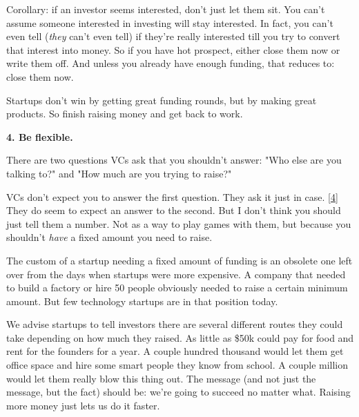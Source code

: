 Corollary:
                    if an investor seems interested, don't just let them sit.
                    You can't assume someone interested in investing will stay
                    interested. In fact, you can't even tell (\emph{they} can't
                    even tell) if they're really interested till you try to
                    convert that interest into money. So if you have hot
                    prospect, either close them now or write them off. And
                    unless you already have enough funding, that reduces to:
                    close them now.

Startups don't win by getting
                    great funding rounds, but by making great products. So
                    finish raising money and get back to work.


                    \textbf{4. Be flexible.}

There are two questions
                    VCs ask that you shouldn't answer: "Who else are you talking
                    to?" and "How much are you trying to raise?"

VCs
                    don't expect you to answer the first question. They ask it
                    just in case.
                    [\href{\#f4n}{4}]
                    They do seem to expect an answer to the second. But I don't
                    think you should just tell them a number. Not as a way to
                    play games with them, but because you shouldn't
                    \emph{have} a fixed amount you need to raise.

The
                    custom of a startup needing a fixed amount of funding is an
                    obsolete one left over from the days when startups were more
                    expensive. A company that needed to build a factory or hire
                    50 people obviously needed to raise a certain minimum
                    amount. But few technology startups are in that position
                    today.

We advise startups to tell investors there
                    are several different routes they could take depending on
                    how much they raised. As little as \$50k could pay for food
                    and rent for the founders for a year. A couple hundred
                    thousand would let them get office space and hire some smart
                    people they know from school. A couple million would let
                    them really blow this thing out. The message (and not just
                    the message, but the fact) should be: we're going to succeed
                    no matter what. Raising more money just lets us do it
                    faster.

